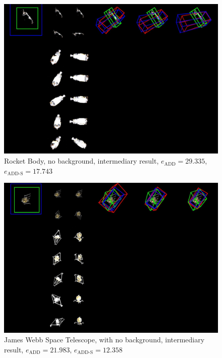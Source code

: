 \begin{figure}[ht]
  \centering
  \includegraphics[width=\textwidth]{data/fig14.jpg}
  \caption{Rocket Body, no background, intermediary result, $e_\mathrm{ADD}=29.335$, $e_{\mathrm{ADD}\text{-}\mathrm{S}}=17.743$}
  \label{fig:fig14}
\end{figure}

\begin{figure}[ht]
  \centering
  \includegraphics[width=\textwidth]{data/fig15.jpg}
  \caption{James Webb Space Telescope, with no background, intermediary result, $e_\mathrm{ADD}=21.983$, $e_{\mathrm{ADD}\text{-}\mathrm{S}}=12.358$}
  \label{fig:fig15}
\end{figure}

